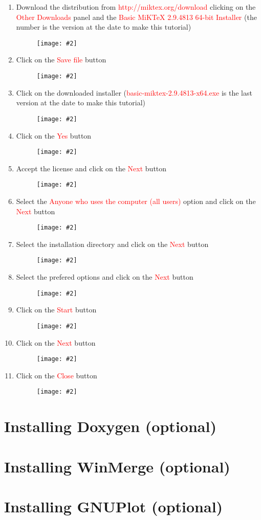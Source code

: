 \documentclass[a4paper]{article}
\newcommand{\FIG}[2]
{
	\begin{figure}[ht!]
	\centering
	\texttt{[image: \#2]}
	\end{figure}
}
\newcommand{\FIGUREB}[1]{\FIG{0.26}{#1}}
\newcommand{\RED}[1] {\textcolor{red}{#1}}
\begin{document}
\begin{enumerate}

\item Download the distribution from \RED{http://miktex.org/download} clicking
on the \RED{Other Downloads} panel and the
\RED{Basic MiKTeX 2.9.4813 64-bit Installer} (the number is the version at the
date to make this tutorial)
\FIGUREB{Latex-1.png.eps}

\clearpage

\item Click on the \RED{Save file} button
\FIGUREB{Latex-2.png.eps}

\item Click on the downloaded installer (\RED{basic-miktex-2.9.4813-x64.exe}
is the last version at the date to make this tutorial)
\FIGUREB{Latex-3.png.eps}

\clearpage

\item Click on the \RED{Yes} button
\FIGUREB{Latex-4.png.eps}

\item Accept the license and click on the \RED{Next} button
\FIGUREB{Latex-5.png.eps}

\clearpage

\item Select the \RED{Anyone who uses the computer (all users)} option and click
on the \RED{Next} button
\FIGUREB{Latex-6.png.eps}

\item Select the installation directory and click on the \RED{Next} button
\FIGUREB{Latex-7.png.eps}

\clearpage

\item Select the prefered options and click on the \RED{Next} button
\FIGUREB{Latex-8.png.eps}

\item Click on the \RED{Start} button
\FIGUREB{Latex-9.png.eps}

\clearpage

\item Click on the \RED{Next} button
\FIGUREB{Latex-10.png.eps}

\item Click on the \RED{Close} button
\FIGUREB{Latex-11.png.eps}

\end{enumerate}

\clearpage

\section{Installing Doxygen (optional)}

\section{Installing WinMerge (optional)}

\section{Installing GNUPlot (optional)}
\end{document}
